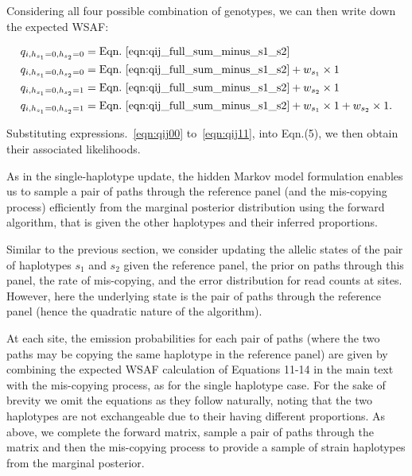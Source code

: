 \documentclass{article}
\begin{document}
\noindent Considering all four possible combination of genotypes, we can then write down the expected WSAF:

\begin{align}
q_{i,h_{s_1}=0,h_{s_2}=0} & = \textrm{Eqn.~\eqref{eqn:qij_full_sum_minus_s1_s2}} \label{eqn:qij00}\\
q_{i,h_{s_1}=0,h_{s_2}=0} & = \textrm{Eqn.~\eqref{eqn:qij_full_sum_minus_s1_s2}} + w_{s_1} \times 1 \label{eqn:qij10}\\
q_{i,h_{s_1}=0,h_{s_2}=1} & = \textrm{Eqn.~\eqref{eqn:qij_full_sum_minus_s1_s2}} + w_{s_2} \times 1 \label{eqn:qij01}\\
q_{i,h_{s_1}=0,h_{s_2}=1} & = \textrm{Eqn.~\eqref{eqn:qij_full_sum_minus_s1_s2}} + w_{s_1} \times 1 + w_{s_2} \times 1 \label{eqn:qij11}.
\end{align}

\noindent Substituting expressions.~\eqref{eqn:qij00} to~\eqref{eqn:qij11}, into Eqn.(5), we then obtain their associated likelihoods.

As in the single-haplotype update, the hidden Markov model formulation enables us to sample a pair of paths through the reference panel (and the mis-copying process) efficiently from the marginal posterior distribution using the forward algorithm, that is given the other haplotypes and their inferred proportions.


Similar to the previous section, we consider updating the allelic states of the pair of haplotypes $s_1$ and $s_2$ given the reference panel, the prior on paths through this panel, the rate of mis-copying, and the error distribution for read counts at sites.  However, here the underlying state is the pair of paths through the reference panel (hence the quadratic nature of the algorithm).

At each site, the emission probabilities for each pair of paths (where the two paths may be copying the same haplotype in the reference panel) are given by combining the expected WSAF calculation of Equations 11-14 in the main text with the mis-copying process, as for the single haplotype case.  For the sake of brevity we omit the equations as they follow naturally, noting that the two haplotypes are not exchangeable due to their having different proportions.  As above, we complete the forward matrix, sample a pair of paths through the matrix and then the mis-copying process to provide a sample of strain haplotypes from the marginal posterior.
\end{document}
